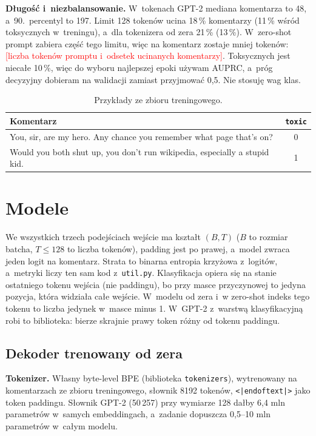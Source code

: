 \documentclass[10pt,a4paper]{article}
\newcommand{\todo}[1]{\textcolor{red}{[#1]}}
\begin{document}
\textbf{Długość i~niezbalansowanie.} W~tokenach GPT-2 mediana komentarza to 48, a~90.\ percentyl to 197. Limit 128 tokenów ucina 18\,\% komentarzy (11\,\% wśród toksycznych w~treningu), a~dla tokenizera od zera 21\,\% (13\,\%). W~zero-shot prompt zabiera część tego limitu, więc na komentarz zostaje mniej tokenów: \todo{liczba tokenów promptu i~odsetek ucinanych komentarzy}. Toksycznych jest niecałe 10\,\%, więc do wyboru najlepszej epoki używam AUPRC, a~próg decyzyjny dobieram na walidacji zamiast przyjmować 0,5. Nie stosuję wag klas.

\begin{table}[htbp]
\centering
\small
\begin{tabular}{p{11.5cm}c}
\toprule
Komentarz & \texttt{toxic} \\
\midrule
You, sir, are my hero. Any chance you remember what page that's on? & 0 \\
Would you both shut up, you don't run wikipedia, especially a stupid kid. & 1 \\
\bottomrule
\end{tabular}
\caption{Przykłady ze zbioru treningowego.}
\end{table}

\section{Modele}

We wszystkich trzech podejściach wejście ma kształt $(B, T)$ ($B$ to rozmiar batcha, $T \le 128$ to liczba tokenów), padding jest po prawej, a~model zwraca jeden logit na komentarz. Strata to binarna entropia krzyżowa z~logitów, a~metryki liczy ten sam kod z~\texttt{util.py}. Klasyfikacja opiera się na stanie ostatniego tokenu wejścia (nie paddingu), bo przy masce przyczynowej to jedyna pozycja, która widziała całe wejście. W~modelu od zera i~w zero-shot indeks tego tokenu to liczba jedynek w~masce minus 1. W~GPT-2 z~warstwą klasyfikacyjną robi to biblioteka: bierze skrajnie prawy token różny od tokenu paddingu.

\subsection{Dekoder trenowany od zera}

\textbf{Tokenizer.} Własny byte-level BPE (biblioteka \texttt{tokenizers}), wytrenowany na komentarzach ze zbioru treningowego, słownik 8192 tokenów, \texttt{<|endoftext|>} jako token paddingu. Słownik GPT-2 (50\,257) przy wymiarze 128 dałby 6,4 mln parametrów w~samych embeddingach, a~zadanie dopuszcza 0,5--10 mln parametrów w~całym modelu.
\end{document}
